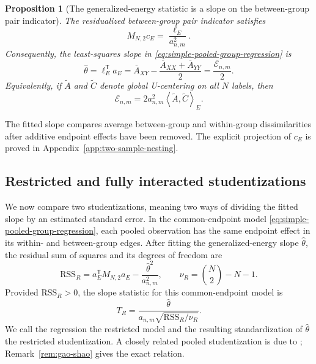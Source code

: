\documentclass[11pt]{article}
\theoremstyle{plain}
\newtheorem{proposition}[theorem]{Proposition}
\theoremstyle{definition}
\theoremstyle{remark}
\newcommand{\inner}[2]{\left\langle #1,#2\right\rangle}
\begin{document}
\begin{proposition}[The generalized-energy statistic is a slope on the between-group pair indicator]
\label{prop:energy-group-slope}
The residualized between-group pair indicator satisfies
\begin{equation}
 M_{N,2}c_E=\frac{\ell_E}{a_{n,m}^2}.
 \label{eq:ucentered-group-indicator}
\end{equation}
Consequently, the least-squares slope in
\eqref{eq:simple-pooled-group-regression} is
\begin{equation}
 \widehat\theta
 =\ell_E^\mathsf Ta_E
 =\overline A_{XY}-\frac{\overline A_{XX}+\overline A_{YY}}2
 =\frac{\mathcal E_{n,m}}2.
 \label{eq:energy-as-group-slope}
\end{equation}
Equivalently, if $\widetilde A$ and $\widetilde C$ denote global U-centering
on all $N$ labels, then
\begin{equation}
 \mathcal E_{n,m}
 =2a_{n,m}^2\inner{\widetilde A}{\widetilde C}_E.
 \label{eq:energy-as-ucentered-label-covariance}
\end{equation}
\end{proposition}

The fitted slope compares average between-group and within-group
dissimilarities after additive endpoint effects have been removed.  The
explicit projection of $c_E$ is proved in
Appendix~\ref{app:two-sample-nesting}.

\subsection{Restricted and fully interacted studentizations}

We now compare two studentizations, meaning two ways of dividing the fitted
slope by an estimated standard error.
In the common-endpoint model \eqref{eq:simple-pooled-group-regression}, each
pooled observation has the same endpoint effect in its within- and
between-group edges.  After fitting the generalized-energy slope
$\widehat\theta$, the residual sum of
squares and its degrees of freedom are
\begin{equation}
 \mathrm{RSS}_R
 =a_E^\mathsf TM_{N,2}a_E-\frac{\widehat\theta^2}{a_{n,m}^2},
 \qquad
 \nu_R=\binom N2-N-1.
 \label{eq:restricted-two-sample-rss}
\end{equation}
Provided $\mathrm{RSS}_R>0$, the slope statistic for this common-endpoint
model is
\begin{equation}
 T_R=\frac{\widehat\theta}
 {a_{n,m}\sqrt{\mathrm{RSS}_R/\nu_R}}.
 \label{eq:restricted-energy-t}
\end{equation}
We call the regression the restricted model and the resulting standardization
of $\widehat\theta$ the restricted studentization.  A closely related pooled
studentization is due to \citet{GaoShao2023};
Remark~\ref{rem:gao-shao} gives the exact relation.
\end{document}
